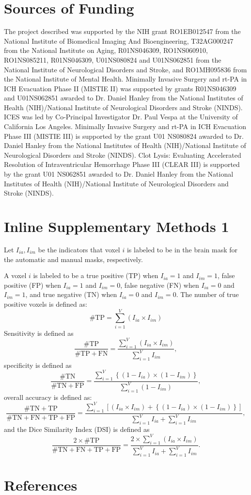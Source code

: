 \documentclass{elsarticle}\usepackage[]{graphicx}\usepackage[]{color}
\begin{document}
\section*{Sources of Funding}
The project described was supported by the NIH grant RO1EB012547 from the National Institute of Biomedical Imaging And Bioengineering, T32AG000247 from the National Institute on Aging, R01NS046309, RO1NS060910, RO1NS085211, R01NS046309, U01NS080824 and U01NS062851 from the National Institute of Neurological Disorders and Stroke, and RO1MH095836 from the National Institute of Mental Health. Minimally Invasive Surgery and rt-PA in ICH Evacuation Phase II (MISTIE II) was supported by grants R01NS046309 and U01NS062851 awarded to Dr. Daniel Hanley from the National Institutes of Health (NIH)/National Institute of Neurological Disorders and Stroke (NINDS).  ICES was led by Co-Principal Investigator Dr. Paul Vespa at the University of California Los Angeles. Minimally Invasive Surgery and rt-PA in ICH Evacuation Phase III (MISTIE III) is supported by the grant U01 NS080824 awarded to Dr. Daniel Hanley from the National Institutes of Health (NIH)/National Institute of Neurological Disorders and Stroke (NINDS). Clot Lysis: Evaluating Accelerated Resolution of Intraventricular Hemorrhage Phase III (CLEAR III) is supported by the grant U01 NS062851 awarded to Dr. Daniel Hanley from the National Institutes of Health (NIH)/National Institute of Neurological Disorders and Stroke (NINDS). 

\section*{Inline Supplementary Methods 1}
Let $I_{ia}, I_{im}$ be the indicators that voxel $i$ is labeled to be in the brain mask for the automatic and manual masks, respectively.  

A voxel $i$ is labeled to be a true positive (TP) when $I_{ia} = 1$ and $I_{im} = 1$, false positive (FP) when $I_{ia} = 1$ and $I_{im} = 0$, false negative (FN) when $I_{ia} = 0$ and $I_{im} = 1$, and true negative (TN) when $I_{ia} = 0$ and $I_{im} = 0$.  The number of true positive voxels is defined as: 
$$
\# \text{TP} = \sum_{i=1}^{V} \left( I_{ia} \times I_{im}\right)
$$
Sensitivity is defined as
$$
\frac{\# \text{TP} }{\# \text{TP} + \text{FN}} = \frac{ \sum_{i=1}^{V} \left( I_{ia} \times I_{im}\right) }{ \sum_{i=1}^{V} I_{im}},
$$
specificity is defined as
$$
\frac{\# \text{TN} }{\# \text{TN} + \text{FP}} = \frac{ \sum_{i=1}^{V} \left\{ (1-I_{ia}) \times (1- I_{im} ) \right\} }{ \sum_{i=1}^{V} (1 - I_{im} )},
$$
overall accuracy is defined as:
$$
\frac{\# \text{TN} + \text{TP} }{\# \text{TN} + \text{FN} + \text{TP} + \text{FP}} = \frac{ \sum_{i=1}^{V} \left[ (I_{ia} \times I_{im}) + \left\{ (1-I_{ia}) \times (1- I_{im} ) \right\} \right] }{\sum_{i=1}^{V} I_{ia}  + \sum_{i=1}^{V} I_{im}},
$$
and the Dice Similarity Index (DSI) is defined as
$$
\frac{2 \times \#\text{TP} }{ \# \text{TN} + \text{FN} + \text{TP} + \text{FP}} = \frac{ 2 \times \sum_{i=1}^{V} \left( I_{ia} \times I_{im}\right) }{\sum_{i=1}^{V} I_{ia}  + \sum_{i=1}^{V} I_{im}}.
$$




\newpage
\section*{References}


\end{document}
